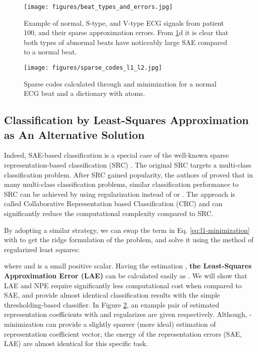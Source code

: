 \documentclass[journal,transmag]{IEEEtran}
\begin{document}
\begin{figure}[!htbp]
    \captionsetup{font=footnotesize}
    \centering
    \texttt{[image: figures/beat\_types\_and\_errors.jpg]}
    \caption{Example of normal, S-type, and V-type ECG signals from patient 100, and their sparse approximation errors. From \ref{fig:beat_types_and_errors}d it is clear that both types of abnormal beats have noticeably large SAE compared to a normal beat.}
    \label{fig:beat_types_and_errors}
\end{figure}



\begin{figure}[!htbp]
    \captionsetup{font=footnotesize}
    \centering
    \texttt{[image: figures/sparse\_codes\_l1\_l2.jpg]}
    \caption{Sparse codes calculated through  and  minimization for a normal ECG beat and a dictionary with  atoms.}
    \label{fig:sparse_codes_l1_l2}
\end{figure}

\subsection{Classification by Least-Squares Approximation as An Alternative Solution} \label{sec:LAE}

Indeed, SAE-based classification is a special case of the well-known sparse representation-based classification (SRC) \cite{SRC1}. The original SRC targets a multi-class classification problem. After SRC gained popularity, the authors of \cite{collaborative} proved that in many multi-class classification problems, similar classification performance to SRC can be achieved by using  regularization instead of  or . The approach is called Collaborative Representation based Classification (CRC) and can significantly reduce the computational complexity compared to SRC.

By adopting a similar strategy, we can swap the  term in Eq. \eqref{eq:l1-minimization} with  to get the ridge formulation of the problem, and solve it using the method of regularized least squares: 

where  and  is a small positive scalar. Having the estimation , \textbf{the Least-Squares Approximation Error (LAE)} can be calculated easily as . We will show that LAE and NPE require significantly less computational cost when compared to SAE, and provide almost identical classification results with the simple thresholding-based classifier. In Figure \ref{fig:sparse_codes_l1_l2}, an example pair of estimated representation coefficients with  and  regularizes are given respectively. Although, -minimization can provide a slightly sparser (more ideal) estimation of representation coefficient vector, the energy of the representation errors (SAE, LAE) are almost identical for this specific task.
\end{document}
